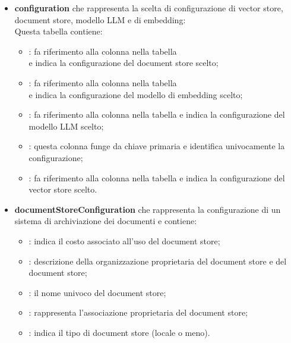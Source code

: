 \documentclass[10pt, a4paper]{article}
\begin{document}
\begin{itemize}
     \item \textbf{configuration} che rappresenta la scelta di configurazione di vector store, document store, modello LLM e di embedding:\\
     Questa tabella contiene:
    \begin{itemize}
        \item {}: fa riferimento alla colonna  nella tabella \\ e indica la configurazione del document store scelto;
        \item {}: fa riferimento alla colonna  nella tabella \\ e indica la configurazione del modello di embedding scelto;
        \item {}: fa riferimento alla colonna  nella tabella  e indica la configurazione del modello LLM scelto;
        \item {}: questa colonna funge da chiave primaria e identifica univocamente la configurazione;
        \item {}: fa riferimento alla colonna  nella tabella  e indica la configurazione del vector store scelto.\\
    \end{itemize}

    \item \textbf{documentStoreConfiguration} che rappresenta la configurazione di un sistema di archiviazione dei documenti e contiene:
    \begin{itemize}
        \item {}: indica il costo associato all'uso del document store;
         \item {}: descrizione della organizzazione proprietaria del document store e del document store;
        \item {}: il nome univoco del document store;
        \item {}: rappresenta l'associazione proprietaria del document store;
        \item {}: indica il tipo di document store (locale o meno).\\
    \end{itemize}


\end{itemize}
\end{document}
